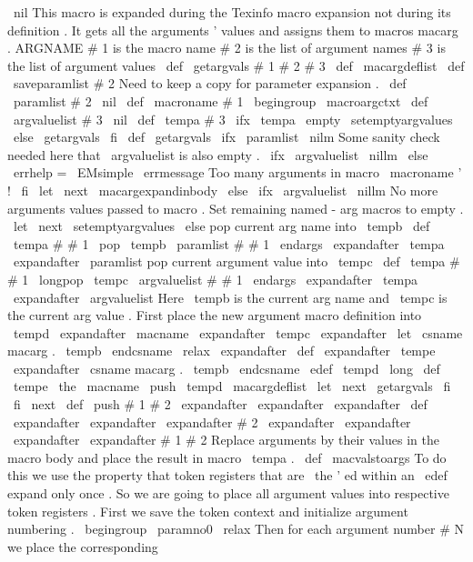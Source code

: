 {{{{
\
nil
}
%
%
This
macro
is
expanded
during
the
Texinfo
macro
expansion
not
during
its
%
definition
.
It
gets
all
the
arguments
'
values
and
assigns
them
to
macros
%
macarg
.
ARGNAME
%
%
#
1
is
the
macro
name
%
#
2
is
the
list
of
argument
names
%
#
3
is
the
list
of
argument
values
\
def
\
getargvals
#
1
#
2
#
3
{
%
\
def
\
macargdeflist
{
}
%
\
def
\
saveparamlist
{
#
2
}
%
Need
to
keep
a
copy
for
parameter
expansion
.
\
def
\
paramlist
{
#
2
\
nil
}
%
\
def
\
macroname
{
#
1
}
%
\
begingroup
\
macroargctxt
\
def
\
argvaluelist
{
#
3
\
nil
}
%
\
def
\
tempa
{
#
3
}
%
\
ifx
\
tempa
\
empty
\
setemptyargvalues
\
else
\
getargvals
\
fi
}
\
def
\
getargvals
{
%
\
ifx
\
paramlist
\
nilm
%
Some
sanity
check
needed
here
that
\
argvaluelist
is
also
empty
.
\
ifx
\
argvaluelist
\
nillm
\
else
\
errhelp
=
\
EMsimple
\
errmessage
{
Too
many
arguments
in
macro
\
macroname
'
!
}
%
\
fi
\
let
\
next
\
macargexpandinbody
\
else
\
ifx
\
argvaluelist
\
nillm
%
No
more
arguments
values
passed
to
macro
.
Set
remaining
named
-
arg
%
macros
to
empty
.
\
let
\
next
\
setemptyargvalues
\
else
%
pop
current
arg
name
into
\
tempb
\
def
\
tempa
#
#
1
{
\
pop
{
\
tempb
}
{
\
paramlist
}
#
#
1
\
endargs
}
%
\
expandafter
\
tempa
\
expandafter
{
\
paramlist
}
%
%
pop
current
argument
value
into
\
tempc
\
def
\
tempa
#
#
1
{
\
longpop
{
\
tempc
}
{
\
argvaluelist
}
#
#
1
\
endargs
}
%
\
expandafter
\
tempa
\
expandafter
{
\
argvaluelist
}
%
%
Here
\
tempb
is
the
current
arg
name
and
\
tempc
is
the
current
arg
value
.
%
First
place
the
new
argument
macro
definition
into
\
tempd
\
expandafter
\
macname
\
expandafter
{
\
tempc
}
%
\
expandafter
\
let
\
csname
macarg
.
\
tempb
\
endcsname
\
relax
\
expandafter
\
def
\
expandafter
\
tempe
\
expandafter
{
%
\
csname
macarg
.
\
tempb
\
endcsname
}
%
\
edef
\
tempd
{
\
long
\
def
\
tempe
{
\
the
\
macname
}
}
%
\
push
\
tempd
\
macargdeflist
\
let
\
next
\
getargvals
\
fi
\
fi
\
next
}
\
def
\
push
#
1
#
2
{
%
\
expandafter
\
expandafter
\
expandafter
\
def
\
expandafter
\
expandafter
\
expandafter
#
2
%
\
expandafter
\
expandafter
\
expandafter
{
%
\
expandafter
#
1
#
2
}
%
}
%
Replace
arguments
by
their
values
in
the
macro
body
and
place
the
result
%
in
macro
\
tempa
.
%
\
def
\
macvalstoargs
{
%
%
To
do
this
we
use
the
property
that
token
registers
that
are
\
the
'
ed
%
within
an
\
edef
expand
only
once
.
So
we
are
going
to
place
all
argument
%
values
into
respective
token
registers
.
%
%
First
we
save
the
token
context
and
initialize
argument
numbering
.
\
begingroup
\
paramno0
\
relax
%
Then
for
each
argument
number
#
N
we
place
the
corresponding
}}}}

